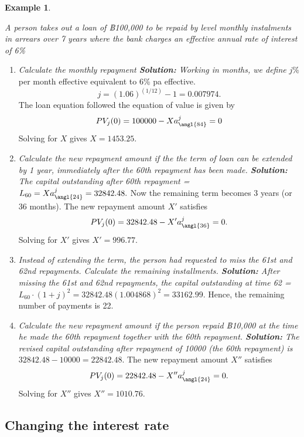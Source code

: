 \documentclass[
]{book}
\theoremstyle{definition}
\theoremstyle{definition}
\newtheorem{example}{Example}[chapter]
\theoremstyle{definition}
\theoremstyle{definition}
\theoremstyle{remark}
\begin{document}
\begin{example}
\protect\hypertarget{exm:unlabeled-div-50}{}\label{exm:unlabeled-div-50}

\emph{A person takes out a loan of ฿100,000 to be repaid by level monthly
instalments in arrears over 7 years where the bank charges an effective
annual rate of interest of 6\%}

\begin{enumerate}
\def\labelenumi{\arabic{enumi}.}
\item
  \emph{Calculate the monthly repayment \textbf{Solution:} Working in months, we
  define} \(j\%\) per month effective equivalent to 6\% pa effective.
  \[j = (1.06)^{(1/12)} - 1 = 0.007974.\] The loan equation followed
  the equation of value is given by
  \[PV_j(0) = 100000 - X a^j_{\angl{84}} = 0\] Solving for \(X\) gives
  \(X =1453.25\).
\item
  \emph{Calculate the new repayment amount if the the term of loan can be
  extended by 1 year, immediately after the 60th repayment has been
  made. \textbf{Solution:} The capital outstanding after 60th repayment =}
  \(L_{60} = X a^j_{\angl{24}} = 32842.48.\) Now the remaining term
  becomes 3 years (or 36 months). The new repayment amount \(X'\)
  satisfies \[PV_j(0) = 32842.48 - X' a^j_{\angl{36}} = 0.\] Solving
  for \(X'\) gives \(X' = 996.77\).
\item
  \emph{Instead of extending the term, the person had requested to miss the
  61st and 62nd repayments. Calculate the remaining installments.
  \textbf{Solution:} After missing the 61st and 62nd repayments, the
  capital outstanding at time 62 =}
  \(L_{60}\cdot (1+j)^2 = 32842.48 (1.004868)^2 = 33162.99.\) Hence, the
  remaining number of payments is 22.
\item
  \emph{Calculate the new repayment amount if the person repaid ฿10,000 at
  the time he made the 60th repayment together with the 60th
  repayment. \textbf{Solution:} The revised capital outstanding after
  repayment of 10000 (the 60th repayment) is}
  \(32842.48 - 10000 = 22842.48.\) The new repayment amount \(X''\)
  satisfies \[PV_j(0) = 22842.48 - X'' a^j_{\angl{24}} = 0.\] Solving
  for \(X''\) gives \(X'' = 1010.76\).
\end{enumerate}

\end{example}

\hypertarget{changing-the-interest-rate}{%
\subsection{Changing the interest rate}\label{changing-the-interest-rate}}
\end{document}
